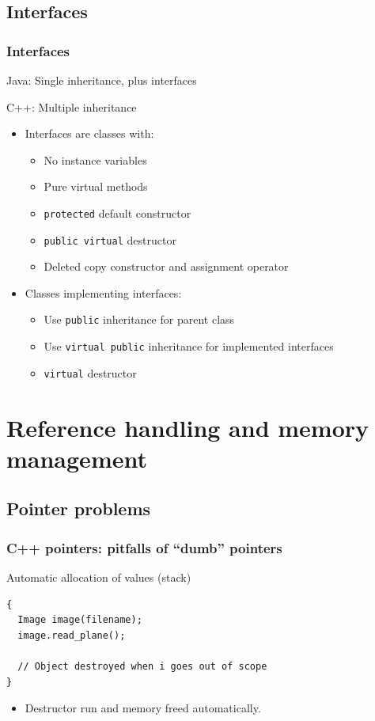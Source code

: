 \documentclass[handout]{beamer}
\begin{document}
\subsection{Interfaces}
\begin{frame}[fragile]
  \frametitle{Interfaces}
\begin{block}{Java: Single inheritance, plus interfaces}
\end{block}
\begin{block}{C++: Multiple inheritance}
  \begin{itemize}
    \pause
  \item Interfaces are classes with:
    \begin{itemize}
      \item No instance variables
      \item Pure virtual methods
      \item \texttt{protected} default constructor
      \item \texttt{public virtual} destructor
      \item Deleted copy constructor and assignment operator
    \end{itemize}
    \pause
  \item Classes implementing interfaces:
    \begin{itemize}
      \item Use \texttt{public} inheritance for parent class
      \item Use \texttt{virtual public} inheritance for implemented interfaces
      \item \texttt{virtual} destructor
    \end{itemize}
  \end{itemize}
\end{block}
\end{frame}

\section{Reference handling and memory management}
\subsection{Pointer problems}
\begin{frame}[fragile]
  \frametitle{C++ pointers: pitfalls of “dumb” pointers}
\begin{block}{Automatic allocation of values (stack)}
  \begin{lstlisting}
{
  Image image(filename);
  image.read_plane();

  // Object destroyed when i goes out of scope
}
\end{lstlisting}
\pause
  \begin{itemize}
  \item Destructor run and memory freed automatically.
  \end{itemize}
\end{block}
\end{frame}
\end{document}
